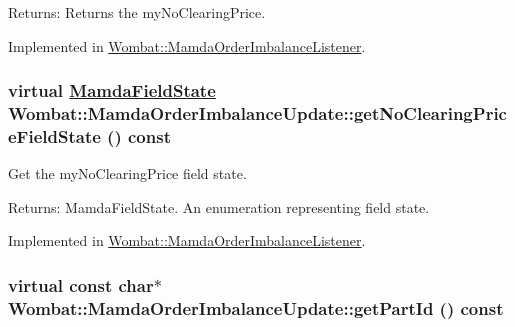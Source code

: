 \begin{Desc}
\item[Returns:]Returns the my\-No\-Clearing\-Price. \end{Desc}


Implemented in \hyperlink{classWombat_1_1MamdaOrderImbalanceListener_c9c3e649371b664623b47f1153927024}{Wombat::Mamda\-Order\-Imbalance\-Listener}.\hypertarget{classWombat_1_1MamdaOrderImbalanceUpdate_2d5900fdfa09d42ed5df1f063f0c21a4}{
\subsubsection[getNoClearingPriceFieldState]{\setlength{\rightskip}{0pt plus 5cm}virtual \hyperlink{namespaceWombat_93aac974f2ab713554fd12a1fa3b7d2a}{Mamda\-Field\-State} Wombat::Mamda\-Order\-Imbalance\-Update::get\-No\-Clearing\-Price\-Field\-State () const}}
\label{classWombat_1_1MamdaOrderImbalanceUpdate_2d5900fdfa09d42ed5df1f063f0c21a4}


Get the my\-No\-Clearing\-Price field state. 

\begin{Desc}
\item[Returns:]Mamda\-Field\-State. An enumeration representing field state. \end{Desc}


Implemented in \hyperlink{classWombat_1_1MamdaOrderImbalanceListener_c0d44a700d7ff3107cd46c0531c4634f}{Wombat::Mamda\-Order\-Imbalance\-Listener}.\hypertarget{classWombat_1_1MamdaOrderImbalanceUpdate_227deba90a0c151d51e60505c296e734}{
\subsubsection[getPartId]{\setlength{\rightskip}{0pt plus 5cm}virtual const char$\ast$ Wombat::Mamda\-Order\-Imbalance\-Update::get\-Part\-Id () const}}
\label{classWombat_1_1MamdaOrderImbalanceUpdate_227deba90a0c151d51e60505c296e734}


